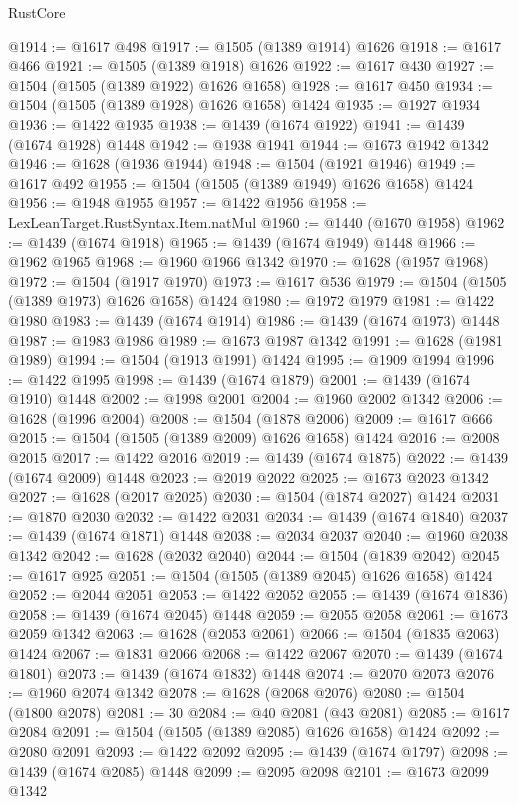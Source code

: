 \begin{lexlean}{RustCore}
\begin{coremodule}
@1914 := @1617 @498
@1917 := @1505 (@1389 @1914) @1626
@1918 := @1617 @466
@1921 := @1505 (@1389 @1918) @1626
@1922 := @1617 @430
@1927 := @1504 (@1505 (@1389 @1922) @1626 @1658)
@1928 := @1617 @450
@1934 := @1504 (@1505 (@1389 @1928) @1626 @1658) @1424
@1935 := @1927 @1934
@1936 := @1422 @1935
@1938 := @1439 (@1674 @1922)
@1941 := @1439 (@1674 @1928) @1448
@1942 := @1938 @1941
@1944 := @1673 @1942 @1342
@1946 := @1628 (@1936 @1944)
@1948 := @1504 (@1921 @1946)
@1949 := @1617 @492
@1955 := @1504 (@1505 (@1389 @1949) @1626 @1658) @1424
@1956 := @1948 @1955
@1957 := @1422 @1956
@1958 := LexLeanTarget.RustSyntax.Item.natMul
@1960 := @1440 (@1670 @1958)
@1962 := @1439 (@1674 @1918)
@1965 := @1439 (@1674 @1949) @1448
@1966 := @1962 @1965
@1968 := @1960 @1966 @1342
@1970 := @1628 (@1957 @1968)
@1972 := @1504 (@1917 @1970)
@1973 := @1617 @536
@1979 := @1504 (@1505 (@1389 @1973) @1626 @1658) @1424
@1980 := @1972 @1979
@1981 := @1422 @1980
@1983 := @1439 (@1674 @1914)
@1986 := @1439 (@1674 @1973) @1448
@1987 := @1983 @1986
@1989 := @1673 @1987 @1342
@1991 := @1628 (@1981 @1989)
@1994 := @1504 (@1913 @1991) @1424
@1995 := @1909 @1994
@1996 := @1422 @1995
@1998 := @1439 (@1674 @1879)
@2001 := @1439 (@1674 @1910) @1448
@2002 := @1998 @2001
@2004 := @1960 @2002 @1342
@2006 := @1628 (@1996 @2004)
@2008 := @1504 (@1878 @2006)
@2009 := @1617 @666
@2015 := @1504 (@1505 (@1389 @2009) @1626 @1658) @1424
@2016 := @2008 @2015
@2017 := @1422 @2016
@2019 := @1439 (@1674 @1875)
@2022 := @1439 (@1674 @2009) @1448
@2023 := @2019 @2022
@2025 := @1673 @2023 @1342
@2027 := @1628 (@2017 @2025)
@2030 := @1504 (@1874 @2027) @1424
@2031 := @1870 @2030
@2032 := @1422 @2031
@2034 := @1439 (@1674 @1840)
@2037 := @1439 (@1674 @1871) @1448
@2038 := @2034 @2037
@2040 := @1960 @2038 @1342
@2042 := @1628 (@2032 @2040)
@2044 := @1504 (@1839 @2042)
@2045 := @1617 @925
@2051 := @1504 (@1505 (@1389 @2045) @1626 @1658) @1424
@2052 := @2044 @2051
@2053 := @1422 @2052
@2055 := @1439 (@1674 @1836)
@2058 := @1439 (@1674 @2045) @1448
@2059 := @2055 @2058
@2061 := @1673 @2059 @1342
@2063 := @1628 (@2053 @2061)
@2066 := @1504 (@1835 @2063) @1424
@2067 := @1831 @2066
@2068 := @1422 @2067
@2070 := @1439 (@1674 @1801)
@2073 := @1439 (@1674 @1832) @1448
@2074 := @2070 @2073
@2076 := @1960 @2074 @1342
@2078 := @1628 (@2068 @2076)
@2080 := @1504 (@1800 @2078)
@2081 := 30
@2084 := @40 @2081 (@43 @2081)
@2085 := @1617 @2084
@2091 := @1504 (@1505 (@1389 @2085) @1626 @1658) @1424
@2092 := @2080 @2091
@2093 := @1422 @2092
@2095 := @1439 (@1674 @1797)
@2098 := @1439 (@1674 @2085) @1448
@2099 := @2095 @2098
@2101 := @1673 @2099 @1342

\end{coremodule}
\end{lexlean}
